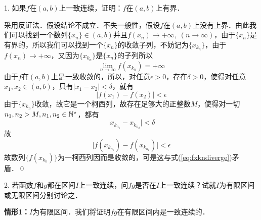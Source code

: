 \exercise

1. 如果$f$在$(a,b)$上一致连续，证明：$f$在$(a,b)$上有界．

\prove 采用反证法．假设结论不成立．不失一般性，假设$f$在$(a,b)$上没有上界．由此我们可以找到一个数列$\{ x_n \} \in (a,b)$并且$f(x_n) \to +\infty, \; (n \to \infty)$，由于$\{ x_n \}$是有界的，所以我们可以找到一个$\{ x_n \}$的收敛子列，不妨记为$\{ x_{k_n}\}$，由于$f(x_n) \to +\infty$，又因为$\{ x_{k_n} \}$是$\{ x_n \}$的子列所以
\begin{equation}
\lim_{n \to \infty} f(x_{k_n} ) = +\infty
\label{eq:fxkndiverge}
\end{equation}
由于$f$在$(a,b)$上是一致收敛的，所以，对任意$\epsilon > 0$，存在$\delta > 0$，使得对任意$x_1, x_2 \in (a,b)$，只有$\lvert x_1 - x_2 \rvert < \delta$，就有
\begin{equation}
    \lvert f(x_1) - f(x_2) \rvert < \epsilon
\end{equation}
由于$\{ x_{k_n} \}$收敛，故它是一个柯西列，故存在足够大的正整数$M$，使得对一切$n_1, n_2 > M, n_1, n_2 \in \mathbb{N}^\star$，都有
\begin{equation}
    \lvert x_{k_{n_1}} - x_{k_{n_2}} \rvert < \delta
\end{equation}
故
\begin{equation}
    \lvert f(x_{k_{n_1}}) - f(x_{k_{n_2}}) \rvert < \epsilon
\end{equation}
故数列$\{ f(x_{k_n}) \}$为一柯西列因而是收敛的，可是这与式(\ref{eq:fxkndiverge})矛盾．\qed\bigskip

2. 若函数$f$和$g$都在区间$I$上一致连续，问$fg$是否在$I$上一致连续？试就$I$为有限区间或无限区间分别讨论之．

\textbf{情形1：}$I$为有限区间．我们将证明$fg$在有限区间内是一致连续的．

